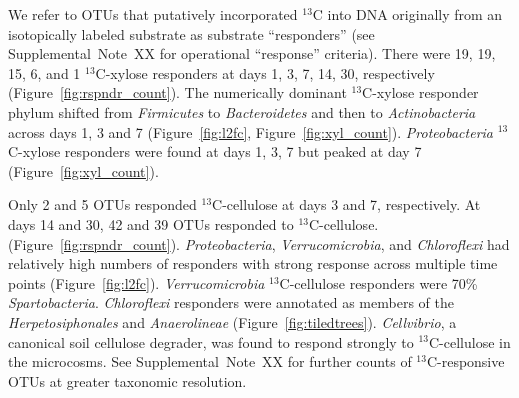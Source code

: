 We refer to OTUs that putatively incorporated $^{13}$C into DNA originally from
an isotopically labeled substrate as  substrate ``responders'' (see
Supplemental~Note~XX for operational ``response'' criteria). There were 19, 19,
15, 6, and 1 $^{13}$C-xylose responders at days 1, 3, 7, 14, 30, respectively
(Figure~\ref{fig:rspndr_count}).
The numerically dominant $^{13}$C-xylose responder phylum shifted from
\textit{Firmicutes} to \textit{Bacteroidetes} and then to
\textit{Actinobacteria} across days 1, 3 and 7 (Figure~\ref{fig:l2fc},
Figure~\ref{fig:xyl_count}). \textit{Proteobacteria} $^{13}$C-xylose responders
were found at days 1, 3, 7 but peaked at day 7 (Figure~\ref{fig:xyl_count}). 

Only 2 and 5 OTUs responded $^{13}$C-cellulose at days 3 and 7, respectively.
At days 14 and 30, 42 and 39 OTUs responded to $^{13}$C-cellulose.
(Figure~\ref{fig:rspndr_count}). 
\textit{Proteobacteria}, \textit{Verrucomicrobia}, and \textit{Chloroflexi} had
relatively high numbers of responders with strong response across multiple time
points (Figure~\ref{fig:l2fc}). \textit{Verrucomicrobia} $^{13}$C-cellulose
responders were 70\% \textit{Spartobacteria}. \textit{Chloroflexi} responders
were annotated as members of the \textit{Herpetosiphonales} and
\textit{Anaerolineae} (Figure~\ref{fig:tiledtrees}). \textit{Cellvibrio},
a canonical soil cellulose degrader, was found to respond strongly to
$^{13}$C-cellulose in the microcosms. See Supplemental~Note~XX for further
counts of $^{13}$C-responsive OTUs at greater taxonomic resolution.

